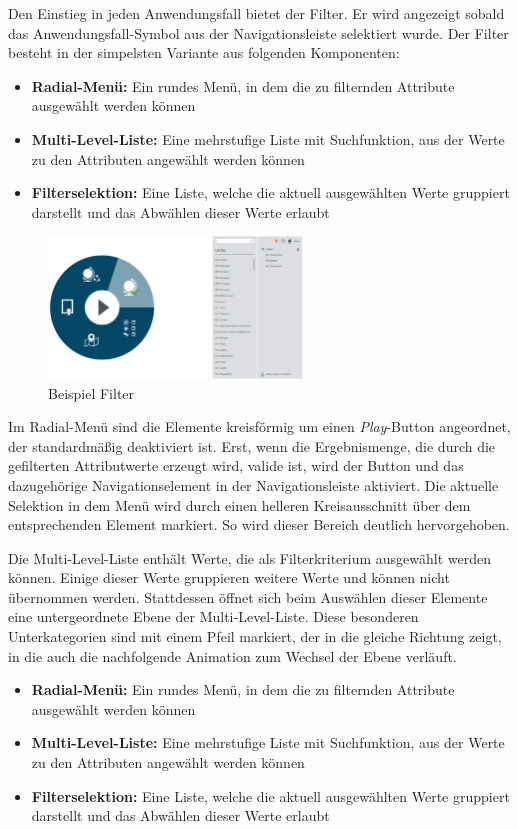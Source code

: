 Den Einstieg in jeden Anwendungsfall bietet der Filter. Er wird angezeigt sobald das Anwendungsfall-Symbol aus der Navigationsleiste selektiert wurde. Der Filter besteht in der simpelsten Variante aus folgenden Komponenten:
\begin{itemize}
	\item \textbf{Radial-Menü:} Ein rundes Menü, in dem die zu filternden Attribute ausgewählt werden können
	\item \textbf{Multi-Level-Liste:} Eine mehrstufige Liste mit Suchfunktion, aus der Werte zu den Attributen angewählt werden können
	\item \textbf{Filterselektion:} Eine Liste, welche die aktuell ausgewählten Werte gruppiert darstellt und das Abwählen dieser Werte erlaubt
\end{itemize}
\begin{figure}[H]
 \centering
 \includegraphics[width=0.6\textwidth]{grafiken/filter_short.png}
 \caption{Beispiel Filter}
 \label{fig:filter}
\end{figure}
Im Radial-Menü sind die Elemente kreisförmig um einen \textit{Play}-Button angeordnet, der standardmäßig deaktiviert ist. Erst, wenn die Ergebnismenge, die durch die gefilterten Attributwerte erzeugt wird, valide ist, wird der Button und das dazugehörige Navigationselement in der Navigationsleiste aktiviert. Die aktuelle Selektion in dem Menü wird durch einen helleren Kreisausschnitt über dem entsprechenden Element markiert. So wird dieser Bereich deutlich hervorgehoben.\par
Die Multi-Level-Liste enthält Werte, die als Filterkriterium ausgewählt werden können. Einige dieser Werte gruppieren weitere Werte und können nicht übernommen werden. Stattdessen öffnet sich beim Auswählen dieser Elemente eine untergeordnete Ebene der Multi-Level-Liste. Diese besonderen Unterkategorien sind mit einem Pfeil markiert, der in die gleiche Richtung zeigt, in die auch die nachfolgende Animation zum Wechsel der Ebene verläuft.\par
\begin{itemize}
	\item \textbf{Radial-Menü:} Ein rundes Menü, in dem die zu filternden Attribute ausgewählt werden können
	\item \textbf{Multi-Level-Liste:} Eine mehrstufige Liste mit Suchfunktion, aus der Werte zu den Attributen angewählt werden können
	\item \textbf{Filterselektion:} Eine Liste, welche die aktuell ausgewählten Werte gruppiert darstellt und das Abwählen dieser Werte erlaubt
\end{itemize}
